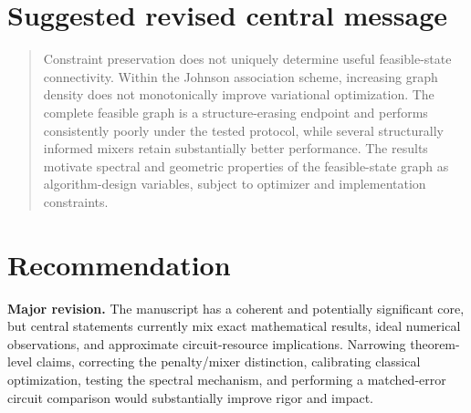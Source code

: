 \documentclass[11pt]{article}
\begin{document}
\section*{Suggested revised central message}
\begin{quote}
Constraint preservation does not uniquely determine useful feasible-state connectivity. Within the Johnson association scheme, increasing graph density does not monotonically improve variational optimization. The complete feasible graph is a structure-erasing endpoint and performs consistently poorly under the tested protocol, while several structurally informed mixers retain substantially better performance. The results motivate spectral and geometric properties of the feasible-state graph as algorithm-design variables, subject to optimizer and implementation constraints.
\end{quote}

\section*{Recommendation}
\textbf{Major revision.} The manuscript has a coherent and potentially significant core, but central statements currently mix exact mathematical results, ideal numerical observations, and approximate circuit-resource implications. Narrowing theorem-level claims, correcting the penalty/mixer distinction, calibrating classical optimization, testing the spectral mechanism, and performing a matched-error circuit comparison would substantially improve rigor and impact.
\end{document}
